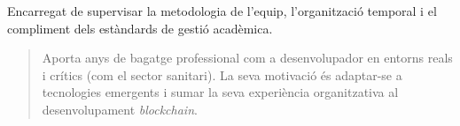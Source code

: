 Encarregat de supervisar la metodologia de l'equip, l'organització temporal i el compliment dels estàndards de gestió acadèmica.

\begin{quote}
    Aporta anys de bagatge professional com a desenvolupador en entorns reals i crítics (com el sector sanitari). La seva motivació és adaptar-se a tecnologies emergents i sumar la seva experiència organitzativa al desenvolupament \textit{blockchain}.
\end{quote}

